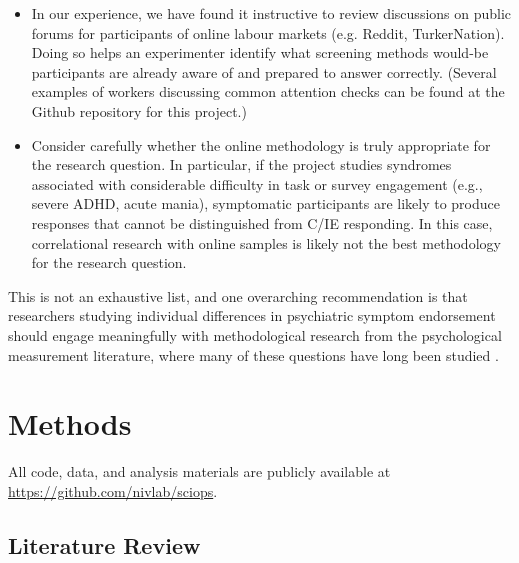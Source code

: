 \documentclass[a4paper,notitlepage,12pt]{article}
\begin{document}
\begin{refsection}[main]
\begin{itemize}
    \item In our experience, we have found it instructive to review discussions on public forums for participants of online labour markets (e.g. Reddit, TurkerNation). Doing so helps an experimenter identify what screening methods would-be participants are already aware of and prepared to answer correctly. (Several examples of workers discussing common attention checks can be found at the Github repository for this project.)
    
    \item Consider carefully whether the online methodology is truly appropriate for the research question. In particular, if the project studies syndromes associated with considerable difficulty in task or survey engagement (e.g., severe ADHD, acute mania), symptomatic participants are likely to produce responses that cannot be distinguished from C/IE responding. In this case, correlational research with online samples is likely not the best methodology for the research question.

\end{itemize}

This is not an exhaustive list, and one overarching recommendation is that researchers studying individual differences in psychiatric symptom endorsement should engage meaningfully with methodological research from the psychological measurement literature, where many of these questions have long been studied \cite{huang2015insufficient, curran2016methods, thomas2017validity, desimone2018dirty, ophir2020turker}.

\newpage

\section{Methods}

All code, data, and analysis materials are publicly available at \url{https://github.com/nivlab/sciops}. 

\subsection{Literature Review}


\end{refsection}
\end{document}
